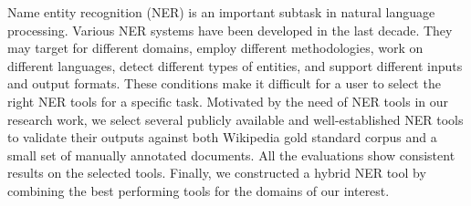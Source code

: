 Name entity recognition (NER) is an important subtask in natural language processing. Various NER systems have been developed in the last decade. They may target for different domains, employ different methodologies, work on different languages, detect different types of entities, and support different inputs and output formats. These conditions make it difficult for a user to select the right NER tools for a specific task. Motivated by the need of NER tools in our research work, we select several publicly available and well-established NER tools to validate their outputs against both Wikipedia gold standard corpus and a small set of manually annotated documents. All the evaluations show consistent results on the selected tools. Finally, we constructed a hybrid NER tool by combining the best performing tools for the domains of our interest.
